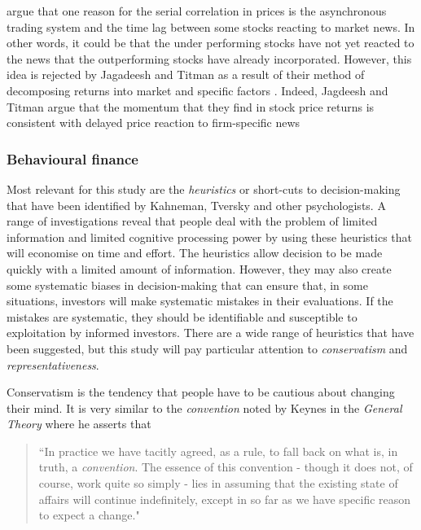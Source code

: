 \documentclass[12pt, a4paper, oneside]{article} %
\begin{document}
\citep{LoMacKinlay1990} argue that one reason for the serial correlation in prices is the asynchronous trading system and the time lag between some stocks reacting to market news.  In other words, it could be that the under performing stocks have not yet reacted to the news that the outperforming stocks have already incorporated.  However, this idea is rejected by Jagadeesh and Titman as a result of their method of decomposing returns into market and specific factors \citep[p. 73]{Jagadeesh}.  Indeed, Jagdeesh and Titman argue that the momentum that they find in stock price returns is consistent with delayed price reaction to firm-specific news \citep{Jagadeesh} 




\subsubsection{Behavioural finance}

Most relevant for this study are the \emph{heuristics} or short-cuts to decision-making that have been identified by Kahneman, Tversky and other psychologists.   A range of investigations reveal that people deal with the problem of limited information and limited cognitive processing power by using these heuristics  that will economise on time and effort.  The heuristics allow decision to be made quickly with a limited amount of information.  However, they may also create some systematic biases in decision-making that can ensure that, in some situations, investors will make systematic mistakes in their evaluations.  If the mistakes are systematic, they should be identifiable and susceptible to exploitation by informed investors.  There are a wide range of heuristics that have been suggested, but this study will pay particular attention to \emph{conservatism} and \emph{representativeness}.  

Conservatism is the tendency that people have to be cautious about changing their mind.  It is very similar to the \emph{convention} noted by Keynes in the \emph{General Theory} where he asserts that 
\begin{quotation}
``In practice we have tacitly agreed, as a rule, to fall back on what is, in truth, a \emph{convention}.  The essence of this convention - though it does not, of course, work quite so simply - lies in assuming that the existing state of affairs will continue indefinitely, except in so far as we have specific reason to expect a change."
\end{quotation}
\citep[p. 152]{Keynes1936}
\end{document}
